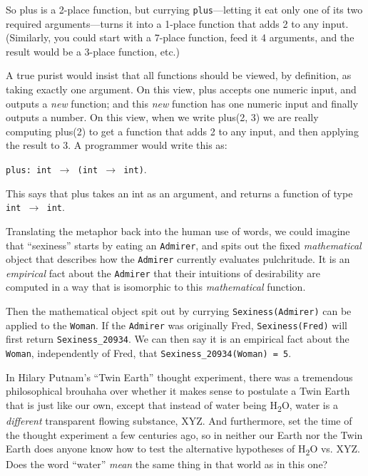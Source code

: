{
 So plus is a 2-place function, but currying \texttt{plus}---letting it eat
only one of its two required arguments---turns it into a 1-place
function that adds 2 to any input. (Similarly, you could start with a
7-place function, feed it 4 arguments, and the result would be a
3-place function, etc.)}

{
 A true purist would insist that all functions should be viewed, by
definition, as taking exactly one argument. On this view, plus accepts
one numeric input, and outputs a \textit{new} function; and this
\textit{new} function has one numeric input and finally outputs a
number. On this view, when we write plus(2, 3) we are really computing
plus(2) to get a function that adds 2 to any input, and then applying
the result to 3. A programmer would write this as:}

\begin{center}
\texttt{plus: int $\rightarrow $ (int $\rightarrow $ int)}.
\end{center}

{
 This says that plus takes an int as an argument, and returns a
function of type \texttt{int $\rightarrow $ int}.}

{
 Translating the metaphor back into the human use of words, we
could imagine that ``sexiness''
starts by eating an \texttt{Admirer}, and spits out the fixed
\textit{mathematical} object that describes how the \texttt{Admirer} currently
evaluates pulchritude. It is an \textit{empirical} fact about the
\texttt{Admirer} that their intuitions of desirability are computed in a way
that is isomorphic to this \textit{mathematical} function.}

{
 Then the mathematical object spit out by currying
\texttt{Sexiness(Admirer)} can be applied to the \texttt{Woman}. If the \texttt{Admirer} was
originally Fred, \texttt{Sexiness(Fred)} will first return \texttt{Sexiness\_20934}. We
can then say it is an empirical fact about the \texttt{Woman}, independently of
Fred, that \texttt{Sexiness\_20934(Woman) = 5}.}

{
 In Hilary Putnam's ``Twin
Earth'' thought experiment, there was a tremendous
philosophical brouhaha over whether it makes sense to postulate a Twin
Earth that is just like our own, except that instead of water being
H\textsubscript{2}O, water is a \textit{different} transparent flowing
substance, XYZ. And furthermore, set the time of the thought experiment
a few centuries ago, so in neither our Earth nor the Twin Earth does
anyone know how to test the alternative hypotheses of
H\textsubscript{2}O vs. XYZ. Does the word
``water'' \textit{mean} the same
thing in that world as in this one?}

